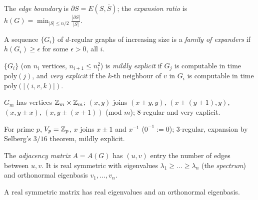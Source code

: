 \begin{definition}
  \label{def:edge-expansion}
  The \emph{edge boundary} is $\partial S=E(S,\overline S)$; the \emph{expansion
  ratio} is $h(G)=\min_{|S|\le n/2}\frac{|\partial S|}{|S|}$.
\end{definition}

\begin{definition}
  \label{def:expander-family}
  A sequence $\{G_i\}$ of $d$-regular graphs of increasing size is a
  \emph{family of expanders} if $h(G_i)\ge\epsilon$ for some $\epsilon>0$, all
  $i$.
\end{definition}

\begin{definition}
  \label{def:explicit}
  $\{G_i\}$ (on $n_i$ vertices, $n_{i+1}\le n_i^2$) is \emph{mildly explicit} if
  $G_j$ is computable in time $\mathrm{poly}(j)$, and \emph{very explicit} if the
  $k$-th neighbour of $v$ in $G_i$ is computable in time
  $\mathrm{poly}(|(i,v,k)|)$.
\end{definition}

\begin{construction}
  \label{constr:margulis-family}
  $G_m$ has vertices $\mathbb{Z}_m\times\mathbb{Z}_m$; $(x,y)$ joins $(x\pm y,y)$,
  $(x\pm(y+1),y)$, $(x,y\pm x)$, $(x,y\pm(x+1))$ (mod $m$); $8$-regular and very
  explicit.
\end{construction}

\begin{construction}
  \label{constr:zp-family}
  For prime $p$, $V_p=\mathbb{Z}_p$, $x$ joins $x\pm1$ and $x^{-1}$ ($0^{-1}:=0$);
  $3$-regular, expansion by Selberg's $3/16$ theorem, mildly explicit.
\end{construction}

\begin{definition}
  \label{def:adjacency}
  The \emph{adjacency matrix} $A=A(G)$ has $(u,v)$ entry the number of edges
  between $u,v$. It is real symmetric with eigenvalues
  $\lambda_1\ge\dots\ge\lambda_n$ (the \emph{spectrum}) and orthonormal
  eigenbasis $v_1,\dots,v_n$.
\end{definition}

\begin{lemma}
  \label{lem:spectral-theorem}
  \mathlibok
  A real symmetric matrix has real eigenvalues and an orthonormal eigenbasis.
\end{lemma}

